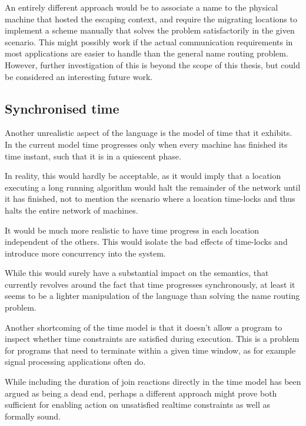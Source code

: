 \vspace{1em}

An entirely different approach would be to associate a name to the physical
machine that hosted the escaping context, and require the migrating locations to
implement a scheme manually that solves the problem satisfactorily in the given
scenario. This might possibly work if the actual communication requirements in
most applications are easier to handle than the general name routing problem.
However, further investigation of this is beyond the scope of this thesis, but
could be considered an interesting future work.

\subsection*{Synchronised time}

Another unrealistic aspect of the language is the model of time that it
exhibits. In the current model time progresses only when every machine has
finished its time instant, such that it is in a quiescent phase.

In reality, this would hardly be acceptable, as it would imply that a location
executing a long running algorithm would halt the remainder of the network until
it has finished, not to mention the scenario where a location time-locks and thus
halts the entire network of machines.

It would be much more realistic to have time progress in each location
independent of the others. This would isolate the bad effects of time-locks and
introduce more concurrency into the system.

While this would surely have a substantial impact on the semantics, that
currently revolves around the fact that time progresses synchronously, at least
it seems to be a lighter manipulation of the language than solving the name
routing problem.

\vspace{1em}

Another shortcoming of the time model is that it doesn't allow a program to
inspect whether time constraints are satisfied during execution.
This is a problem for programs that need to terminate within a given time
window, as for example signal processing applications often do.

While including the duration of join reactions directly in the time model has
been argued as being a dead end, perhaps a different approach might prove both
sufficient for enabling action on unsatisfied realtime constraints as well as
formally sound.

